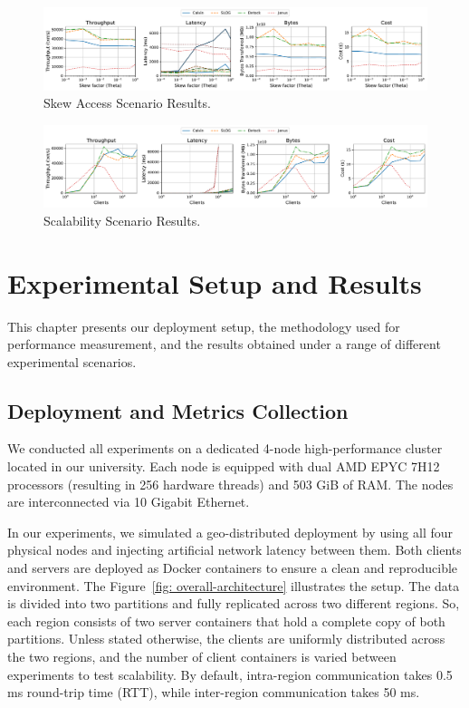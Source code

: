 \begin{figure}[t]
    \centering
    \includegraphics[width=1\textwidth]{figures/Skew.pdf}
    \caption{Skew Access Scenario Results.}
    \label{fig: skew-access-scenario}
\end{figure}

\begin{figure}[t]
    \centering
    \includegraphics[width=1\textwidth]{figures/Scalability.pdf}
    \caption{Scalability Scenario Results.}
    \label{fig: scalability-access-scenario}
\end{figure}

\section{Experimental Setup and Results}
\label{sec: experimental-setup-and-results}
This chapter presents our deployment setup, the methodology used for performance measurement, and the results obtained under a range of different experimental scenarios.

\subsection{Deployment and Metrics Collection}
\label{subsec: deployment-and-metrics-collection}
We conducted all experiments on a dedicated 4-node high-performance cluster located in our university. Each node is equipped with dual AMD EPYC 7H12 processors (resulting in 256 hardware threads) and 503 GiB of RAM. The nodes are interconnected via 10 Gigabit Ethernet.

In our experiments, we simulated a geo-distributed deployment by using all four physical nodes and injecting artificial network latency between them. Both clients and servers are deployed as Docker containers to ensure a clean and reproducible environment. The Figure~\ref{fig: overall-architecture} illustrates the setup. The data is divided into two partitions and fully replicated across two different regions. So, each region consists of two server containers that hold a complete copy of both partitions.  Unless stated otherwise, the clients are uniformly distributed across the two regions, and the number of client containers is varied between experiments to test scalability. By default, intra-region communication takes 0.5 ms round-trip time (RTT), while inter-region communication takes 50 ms.

